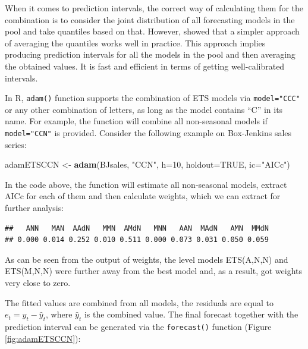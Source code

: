 \documentclass[]{book}
\newenvironment{Shaded}{\begin{snugshade}}{\end{snugshade}}
\newcommand{\DataTypeTok}[1]{\textcolor[rgb]{0.13,0.29,0.53}{#1}}
\newcommand{\DecValTok}[1]{\textcolor[rgb]{0.00,0.00,0.81}{#1}}
\newcommand{\KeywordTok}[1]{\textcolor[rgb]{0.13,0.29,0.53}{\textbf{#1}}}
\newcommand{\NormalTok}[1]{#1}
\newcommand{\OperatorTok}[1]{\textcolor[rgb]{0.81,0.36,0.00}{\textbf{#1}}}
\newcommand{\OtherTok}[1]{\textcolor[rgb]{0.56,0.35,0.01}{#1}}
\newcommand{\StringTok}[1]{\textcolor[rgb]{0.31,0.60,0.02}{#1}}
\theoremstyle{definition}
\theoremstyle{definition}
\theoremstyle{definition}
\theoremstyle{definition}
\theoremstyle{remark}
\begin{document}
When it comes to prediction intervals, the correct way of calculating them for the combination is to consider the joint distribution of all forecasting models in the pool and take quantiles based on that. However, \citet{Lichtendahl2013} showed that a simpler approach of averaging the quantiles works well in practice. This approach implies producing prediction intervals for all the models in the pool and then averaging the obtained values. It is fast and efficient in terms of getting well-calibrated intervals.

In R, \texttt{adam()} function supports the combination of ETS models via \texttt{model="CCC"} or any other combination of letters, as long as the model contains ``C'' in its name. For example, the function will combine all non-seasonal models if \texttt{model="CCN"} is provided. Consider the following example on Box-Jenkins sales series:

\begin{Shaded}
\begin{Highlighting}[]
\NormalTok{adamETSCCN <-}\StringTok{ }\KeywordTok{adam}\NormalTok{(BJsales, }\StringTok{"CCN"}\NormalTok{, }\DataTypeTok{h=}\DecValTok{10}\NormalTok{, }\DataTypeTok{holdout=}\OtherTok{TRUE}\NormalTok{, }\DataTypeTok{ic=}\StringTok{"AICc"}\NormalTok{)}
\end{Highlighting}
\end{Shaded}

In the code above, the function will estimate all non-seasonal models, extract AICc for each of them and then calculate weights, which we can extract for further analysis:

\begin{Shaded}
\end{Shaded}

\begin{verbatim}
##   ANN   MAN  AAdN   MMN  AMdN   MNN   AAN  MAdN   AMN  MMdN 
## 0.000 0.014 0.252 0.010 0.511 0.000 0.073 0.031 0.050 0.059
\end{verbatim}

As can be seen from the output of weights, the level models ETS(A,N,N) and ETS(M,N,N) were further away from the best model and, as a result, got weights very close to zero.

The fitted values are combined from all models, the residuals are equal to \(e_t = y_t -\hat{y}_t\), where \(\hat{y}_t\) is the combined value. The final forecast together with the prediction interval can be generated via the \texttt{forecast()} function (Figure \ref{fig:adamETSCCN}):
\end{document}
